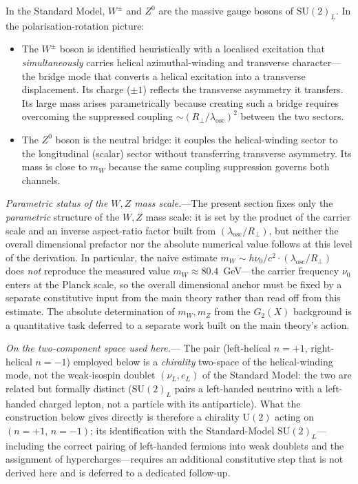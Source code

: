 \documentclass[11pt]{article}
\begin{document}
In the Standard Model, $W^\pm$ and $Z^0$ are
the massive gauge bosons of $\text{SU}(2)_L$.
In the polarisation-rotation picture:

\begin{itemize}
  \item The $W^\pm$ boson is identified
    heuristically with a localised excitation
    that \emph{simultaneously} carries helical
    azimuthal-winding and transverse
    character---the bridge mode that converts a
    helical excitation into a transverse
    displacement.  Its charge ($\pm 1$) reflects
    the transverse asymmetry it transfers.  Its
    large mass arises parametrically because
    creating such a bridge requires overcoming
    the suppressed coupling
    $\sim (R_\perp/\lambda_{\mathrm{osc}})^2$
    between the two sectors.

  \item The $Z^0$ boson is the neutral bridge:
    it couples the helical-winding sector to the
    longitudinal (scalar) sector without
    transferring transverse asymmetry.  Its mass
    is close to $m_W$ because the same coupling
    suppression governs both channels.
\end{itemize}

\textit{Parametric status of the $W,Z$ mass
scale.}---The present section fixes only the
\emph{parametric} structure of the $W,Z$ mass
scale: it is set by the product of the
carrier scale and an inverse aspect-ratio
factor built from
$(\lambda_{\mathrm{osc}}/R_\perp)$, but neither
the overall dimensional prefactor nor the
absolute numerical value follows at this level
of the derivation.  In particular, the naive
estimate
$m_W \sim h\nu_0/c^2 \cdot
(\lambda_{\mathrm{osc}}/R_\perp)$ does
\emph{not} reproduce the measured value
$m_W \approx 80.4$~GeV---the carrier frequency
$\nu_0$ enters at the Planck scale, so the
overall dimensional anchor must be fixed by a
separate constitutive input from the main
theory rather than read off from this estimate.
The absolute determination of $m_W, m_Z$ from
the $G_2(X)$ background is a quantitative task
deferred to a separate work built on the main
theory's action.

\textit{On the two-component space used here.}---%
The pair (left-helical $n=+1$, right-helical
$n=-1$) employed below is a \emph{chirality}
two-space of the helical-winding mode, not the
weak-isospin doublet $(\nu_L, e_L)$ of the
Standard Model: the two are related but
formally distinct ($\mathrm{SU}(2)_L$ pairs a
left-handed neutrino with a left-handed charged
lepton, not a particle with its antiparticle).
What the construction below gives directly is
therefore a chirality $\mathrm{U}(2)$ acting on
$(n=+1,\,n=-1)$; its identification with the
Standard-Model $\mathrm{SU}(2)_L$---including
the correct pairing of left-handed fermions
into weak doublets and the assignment of
hypercharges---requires an additional
constitutive step that is not derived here and
is deferred to a dedicated follow-up.
\end{document}
